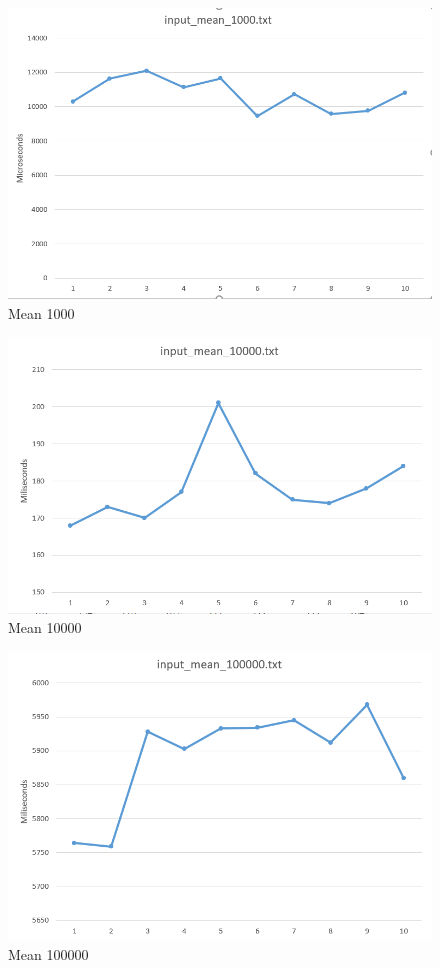 \documentclass[a4paper, 12pt, titlepage]{article}
\begin{document}
\begin{figure}[H]
	\centering
	\caption{Mean 1000}
	\includegraphics[width=.75\textwidth]{mean1000.png} %
\end{figure}

\begin{figure}[H]
	\centering
	\caption{Mean 10000}
	\includegraphics[width=.75\textwidth]{mean10000.png} %
\end{figure}

\begin{figure}[H]
	\centering
	\caption{Mean 100000}
	\includegraphics[width=.75\textwidth]{mean100000.png} %
\end{figure}
\end{document}
